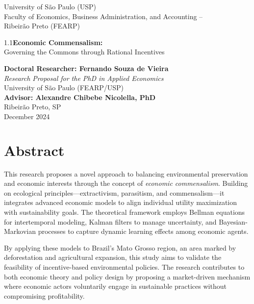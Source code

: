 \documentclass[a4paper,12pt]{article}
\begin{document}
\begin{titlepage}
    \centering
    {\large University of São Paulo (USP)\\[0.25cm]
    Faculty of Economics, Business Administration, and Accounting –\\[0.25cm] 
    Ribeirão Preto (FEARP)}\\[2.5cm]

    \begin{spacing}{1.1}\Huge \textbf{Economic Commensalism:}\\
    Governing the Commons through Rational Incentives
    \end{spacing}

    {\large \textbf{Doctoral Researcher: Fernando Souza de Vieira}}\\[1.5cm]

    \textit{Research Proposal for the PhD in Applied Economics}\\
    University of São Paulo (FEARP/USP)\\[1.5cm]

    {\large \textbf{Advisor: Alexandre Chibebe Nicolella, PhD}}\\[3cm]

    Ribeirão Preto, SP\\
    December 2024

\end{titlepage}

\tableofcontents
\newpage

\section*{Abstract}
This research proposes a novel approach to balancing environmental preservation and economic interests through the concept of \textit{economic commensalism}. Building on ecological principles—extractivism, parasitism, and commensalism—it integrates advanced economic models to align individual utility maximization with sustainability goals. The theoretical framework employs Bellman equations for intertemporal modeling, Kalman filters to manage uncertainty, and Bayesian-Markovian processes to capture dynamic learning effects among economic agents. 

By applying these models to Brazil’s Mato Grosso region, an area marked by deforestation and agricultural expansion, this study aims to validate the feasibility of incentive-based environmental policies. The research contributes to both economic theory and policy design by proposing a market-driven mechanism where economic actors voluntarily engage in sustainable practices without compromising profitability.
\end{document}

